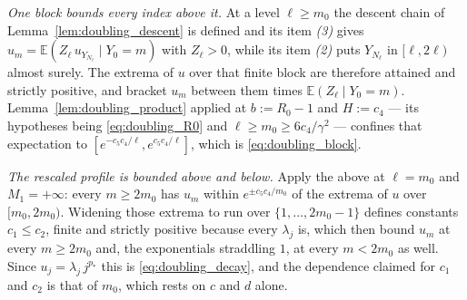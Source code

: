 \emph{One block bounds every index above it.} At a level $\ell\geq m_0$ the descent chain of
Lemma~\ref{lem:doubling_descent} is defined and its item \emph{(3)} gives
$u_m=\mathbb E(Z_\ell\,u_{Y_{N_\ell}}\mid Y_0=m)$ with $Z_\ell>0$, while its item \emph{(2)}
puts $Y_{N_\ell}$ in $[\ell,2\ell)$ almost surely. The extrema of $u$ over that finite block
are therefore attained and strictly positive, and bracket $u_m$ between them times
$\mathbb E(Z_\ell\mid Y_0=m)$. Lemma~\ref{lem:doubling_product} applied at $b:=R_0-1$ and
$H:=c_4$ --- its hypotheses being \eqref{eq:doubling_R0} and $\ell\geq m_0\geq6c_4/\gamma^2$
--- confines that expectation to $[e^{-c_5c_4/\ell},e^{c_5c_4/\ell}]$, which is
\eqref{eq:doubling_block}.

\emph{The rescaled profile is bounded above and below.} Apply the above at $\ell=m_0$ and
$M_1=+\infty$: every $m\geq2m_0$ has $u_m$ within $e^{\pm c_5c_4/m_0}$ of the extrema of $u$
over $[m_0,2m_0)$. Widening those extrema to run over $\{1,\dots,2m_0-1\}$ defines constants
$c_1\leq c_2$, finite and strictly positive because every $\lambda_j$ is, which then bound
$u_m$ at every $m\geq2m_0$ and, the exponentials straddling $1$, at every $m<2m_0$ as well.
Since $u_j=\lambda_j\,j^{p_*}$ this is \eqref{eq:doubling_decay}, and the dependence claimed
for $c_1$ and $c_2$ is that of $m_0$, which rests on $c$ and $d$ alone.
